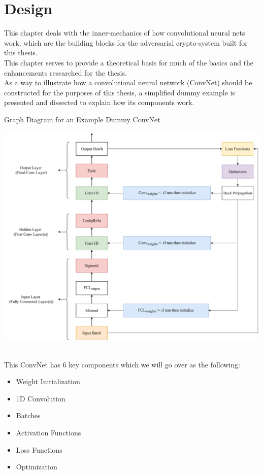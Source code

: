 \documentclass[a4paper, 12pt]{report}
\begin{document}
\chapter{Design}\label{sec:design}
This chapter deals with the inner-mechanics of how convolutional neural nets work, which are the building blocks for the adversarial crypto-system built for this thesis.\\
This chapter serves to provide a theoretical basis for much of the basics and the enhancements researched for the thesis.\\
As a way to illustrate how a convolutional neural network (ConvNet) should be constructed for the purposes of this thesis, a simplified dummy example is presented and dissected to explain how its components work.\\
\begin{blockfigure}{Graph Diagram for an Example Dummy ConvNet}\label{fig:SimpleNetDiagram}
	\begin{center}
		\includegraphics[height = 0.45\textheight]{SimpleNetDiagram}
	\end{center}
\end{blockfigure}\\
This ConvNet has 6 key components which we will go over as the following:
\begin{itemize}[nosep]
	\item Weight Initialization
	\item 1D Convolution
	\item Batches
	\item Activation Functions
	\item Loss Functions
	\item Optimization
\end{itemize}
\newpage
\end{document}

